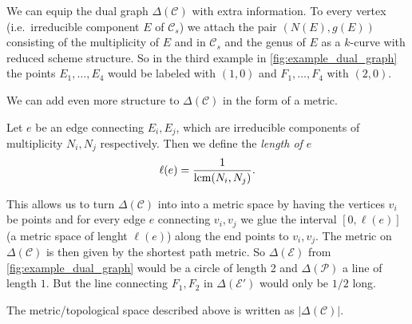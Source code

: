 We can equip the dual graph $\Delta(\mathscr C) $ with extra information. 
To every vertex (i.e.\ irreducible component  $E$ of $\mathscr C_s$) we attach the pair $(N(E), g(E))$ consisting of the multiplicity of $E$ and in $\mathscr C_s$ and the genus of $E$ as a $k$-curve with reduced scheme structure. 
So in the third example in \cref{fig:example_dual_graph} the points $E_1, \ldots, E_4$ would be labeled with $(1, 0)$ and $F_1, \ldots, F_4$ with $(2, 0)$. 

We can add even more structure to $\Delta(\mathscr C)$ in the form of a metric. 
\begin{definition}
Let $e$ be an edge connecting $E_i, E_j$, which are irreducible components of multiplicity $N_i, N_j$ respectively. 
Then we define the \emph{length of $e$ }  \[
	\ell(e) = \frac{1}{\operatorname{lcm} (N_i, N_j)}
.\] 
\end{definition}

This allows us to turn $\Delta(\mathscr C)$ into into a metric space by having the vertices $v_i$ be points and for every edge  $e$ connecting $v_i, v_j$ we glue the interval $[0, \ell(e)]$ (a metric space of lenght $\ell(e)$) along the end points to $v_i, v_j$. 
The metric on $\Delta(\mathscr C)$ is then given by the shortest path metric. 
So $\Delta(\mathscr E )$ from \cref{fig:example_dual_graph} would be a circle of length 2 and $\Delta (\mathscr P)$ a line of length $1$. 
But the line connecting $F_1, F_2$ in $\Delta(\mathscr E')$ would only be $1 /2$ long. 
\begin{definition}
	The metric/topological space described above is written as $|\Delta(\mathscr C)|$. 
\end{definition}

